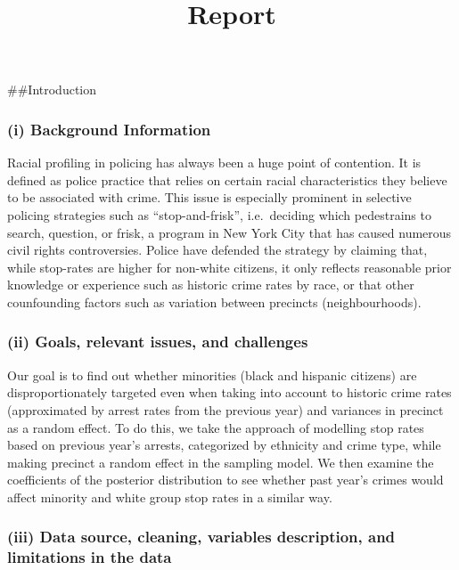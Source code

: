 \documentclass[]{article}
\title{Report}
\author{}
\date{\vspace{-2.5em}}
\begin{document}
\maketitle

\#\#Introduction

\hypertarget{i-background-information}{%
\subsubsection{(i) Background
Information}\label{i-background-information}}

Racial profiling in policing has always been a huge point of contention.
It is defined as police practice that relies on certain racial
characteristics they believe to be associated with crime. This issue is
especially prominent in selective policing strategies such as
``stop-and-frisk'', i.e.~deciding which pedestrains to search, question,
or frisk, a program in New York City that has caused numerous civil
rights controversies. Police have defended the strategy by claiming
that, while stop-rates are higher for non-white citizens, it only
reflects reasonable prior knowledge or experience such as historic crime
rates by race, or that other counfounding factors such as variation
between precincts (neighbourhoods).

\hypertarget{ii-goals-relevant-issues-and-challenges}{%
\subsubsection{(ii) Goals, relevant issues, and
challenges}\label{ii-goals-relevant-issues-and-challenges}}

Our goal is to find out whether minorities (black and hispanic citizens)
are disproportionately targeted even when taking into account to
historic crime rates (approximated by arrest rates from the previous
year) and variances in precinct as a random effect. To do this, we take
the approach of modelling stop rates based on previous year's arrests,
categorized by ethnicity and crime type, while making precinct a random
effect in the sampling model. We then examine the coefficients of the
posterior distribution to see whether past year's crimes would affect
minority and white group stop rates in a similar way.

\hypertarget{iii-data-source-cleaning-variables-description-and-limitations-in-the-data}{%
\subsubsection{(iii) Data source, cleaning, variables description, and
limitations in the
data}\label{iii-data-source-cleaning-variables-description-and-limitations-in-the-data}}
\end{document}
